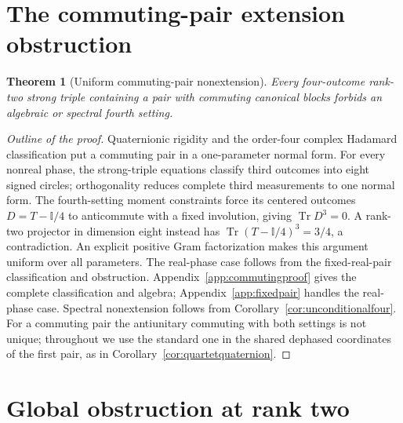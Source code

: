 \documentclass[11pt]{article}
\newtheorem{theorem}{Theorem}[section]
\newcommand{\id}{\mathbb I}
\begin{document}
\section{The commuting-pair extension obstruction}
\begin{theorem}[Uniform commuting-pair nonextension]
\label{thm:commutingnonextension}
Every four-outcome rank-two strong triple containing a pair with
commuting canonical blocks forbids an algebraic or spectral fourth
setting.
\end{theorem}
\begin{proof}[Outline of the proof]
Quaternionic rigidity and the order-four complex Hadamard classification
put a commuting pair in a one-parameter normal form. For every nonreal
phase, the strong-triple equations classify third outcomes into eight
signed circles; orthogonality reduces complete third measurements to one
normal form. The fourth-setting moment constraints force its centered
outcomes $D=T-\id/4$ to anticommute with a fixed involution, giving
$\operatorname{Tr}D^3=0$. A rank-two projector in dimension eight instead
has $\operatorname{Tr}(T-\id/4)^3=3/4$, a contradiction.
An explicit positive Gram factorization makes this argument uniform over
all parameters. The real-phase case follows from the fixed-real-pair
classification and obstruction. Appendix~\ref{app:commutingproof} gives
the complete classification and algebra; Appendix~\ref{app:fixedpair}
handles the real-phase case. Spectral nonextension follows from
Corollary~\ref{cor:unconditionalfour}.
For a commuting pair the antiunitary commuting with both settings is not
unique; throughout we use the standard one in the shared dephased
coordinates of the first pair, as in Corollary~\ref{cor:quartetquaternion}.
\end{proof}

\section{Global obstruction at rank two}
\end{document}
